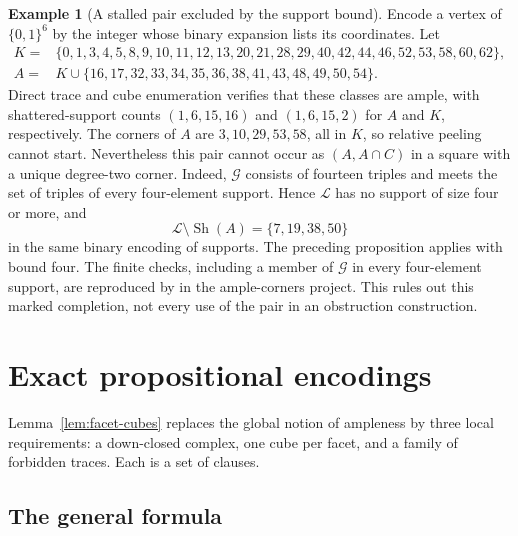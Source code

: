 \documentclass[11pt]{article}
\numberwithin{equation}{section}
\theoremstyle{definition}
\newtheorem{example}[theorem]{Example}
\theoremstyle{remark}
\begin{document}
\begin{example}[A stalled pair excluded by the support bound]
\label{ex:square-thirty-eight-pair}
Encode a vertex of $\{0,1\}^6$ by the integer whose binary expansion
lists its coordinates. Let
\begin{align*}
 K={}&\{0,1,3,4,5,8,9,10,11,12,13,20,21,28,29,40,42,44,46,52,53,58,60,62\},\\
 A={}&K\cup\{16,17,32,33,34,35,36,38,41,43,48,49,50,54\}.
\end{align*}
Direct trace and cube enumeration verifies that these classes are ample,
with shattered-support counts $(1,6,15,16)$ and $(1,6,15,2)$ for $A$
and $K$, respectively. The corners of $A$ are $3,10,29,53,58$, all
in $K$, so relative peeling cannot start. Nevertheless this pair cannot
occur as $(A,A\cap C)$ in a square with a unique degree-two corner.
Indeed, $\mathcal G$ consists of fourteen triples and meets the set of
triples of every four-element support. Hence $\mathcal L$ has no support
of size four or more, and
\[
 \mathcal L\setminus\operatorname{Sh}(A)=\{7,19,38,50\}
\]
in the same binary encoding of supports. The preceding proposition
applies with bound four. The finite checks, including a member of
$\mathcal G$ in every four-element support, are reproduced by
 in the ample-corners project.
This rules out this marked completion, not every use of the pair in
an obstruction construction.
\end{example}

\section{Exact propositional encodings}
\label{sec:encoding}

Lemma~\ref{lem:facet-cubes} replaces the global notion of ampleness by
three local requirements: a down-closed complex, one cube per facet, and a
family of forbidden traces.  Each is a set of clauses.

\subsection{The general formula}
\label{sec:general-formula}
\end{document}

